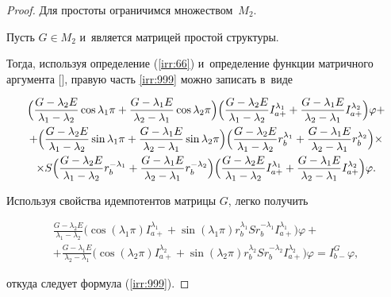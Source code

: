 \begin{proof}

Для простоты ограничимся множеством~$M_{2}$. 

Пусть $G\in M_{2}$ и~является матрицей простой структуры. 

Тогда, используя определение (\ref{irr:66}) и~определение функции матричного аргумента [], правую часть \eqref{irr:999} можно записать в~виде

\begin{multline*}

\Bigl(\frac{G-\lambda_{2}E}{\lambda_{1}-\lambda_{2}}\cos\lambda_{1}\pi+\frac{G-\lambda_{1}E}{\lambda_{2}-\lambda_{1}}\cos\lambda_{2}\pi\Bigr)

\Bigl(\frac{G-\lambda_{2}E}{\lambda_{1}-\lambda_{2}}I^{\lambda_{1}}_{a+}+\frac{G-\lambda_{1}E}{\lambda_{2}-\lambda_{1}}I^{\lambda_{2}}_{a+}\Bigr)\varphi+\\

+\Bigl(\frac{G-\lambda_{2}E}{\lambda_{1}-\lambda_{2}}\sin\lambda_{1}\pi+\frac{G-\lambda_{1}E}{\lambda_{2}-\lambda_{1}}\sin\lambda_{2}\pi\Bigr) 

\Bigl(\frac{G-\lambda_{2}E}{\lambda_{1}-\lambda_{2}}r_{b}^{\lambda_{1}} +\frac{G-\lambda_{1}E}{\lambda_{2}-\lambda_{1}}r_{b}^{\lambda_{2}}\Bigr) \times \\ \times S\Bigl(\frac{G-\lambda_{2}E}{\lambda_{1}-\lambda_{2}}r_{b}^{-\lambda_{1}}+\frac{G-\lambda_{1}E}{\lambda_{2}-\lambda_{1}}r_{b}^{-\lambda_{2}}\Bigr)\Bigl(\frac{G-\lambda_{2}E}{\lambda_{1}-\lambda_{2}}I^{\lambda_{1}}_{a+}+\frac{G-\lambda_{1}E}{\lambda_{2}-\lambda_{1}}I^{\lambda_{2}}_{a+}\Bigr)\varphi.

\end{multline*}

Используя свойства идемпотентов матрицы $G$, легко получить

\begin{multline*}

\frac{G-\lambda_{2}E}{\lambda_{1}-\lambda_{2}}\bigl(\cos(\lambda_{1}\pi)I_{a+}^{\lambda_{1}}+\sin(\lambda_{1}\pi)r_{b}^{\lambda_{1}}Sr_{b}^{-\lambda_{1}}I_{a+}^{\lambda_{1}}\bigr)\varphi+\\

+\frac{G-\lambda_{1}E}{\lambda_{2}-\lambda_{1}}\bigl(\cos(\lambda_{2}\pi)I_{a+}^{\lambda_{2}}+\sin(\lambda_{2}\pi)r_{b}^{\lambda_{2}}Sr_{b}^{-\lambda_{2}}I_{a+}^{\lambda_{2}}\bigr)\varphi=I_{b-}^{G}\varphi,

\end{multline*}

откуда следует формула (\ref{irr:999}).

\end{proof}




